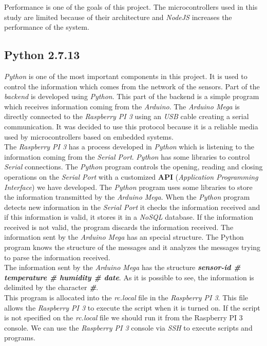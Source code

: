 Performance is one of the goals of this project. The microcontrollers used in this study are limited because of their architecture and \textit{NodeJS} increases the performance of the system.

\subsection{Python 2.7.13}

\textit{Python} is one of the most important components in this project. It is used to control the information which comes from the network of the sensors. Part of the \textit{backend} is developed using \textit{Python}. This part of the backend is a simple program which receives information coming from the \textit{Arduino}. The \textit{Arduino Mega} is directly connected to the \textit{Raspberry PI 3} using an \textit{USB} cable creating a serial communication. It was decided to use this protocol because it is a reliable media used by microcontrollers based on embedded systems.\\

The \textit{Raspberry PI 3} has a process developed in \textit{Python} which is listening to the information coming from the \textit{Serial Port}. \textit{Python} has some libraries to control \textit{Serial} connections. The \textit{Python} program controls the opening, reading and closing operations on the \textit{Serial Port} with a customized \textbf{API} \cite{API} (\textit{Application Programming Interface}) we have developed. The \textit{Python} program uses some libraries to store the information transmitted by the \textit{Arduino Mega}. When the \textit{Python} program detects new information in the \textit{Serial Port} it checks the information received and if this information is valid, it stores it in a \textit{NoSQL} database. If the information received is not valid, the program discards the information received. The information sent by the \textit{Arduino Mega} has an special structure. The Python program knows the structure of the messages and it analyzes the messages trying to parse the information received.\\

The information sent by the \textit{Arduino Mega} has the structure \textit{\textbf{sensor-id \# temperature \# humidity \# date}}. As it is possible to see, the information is delimited by the character \textbf{\textit{\#}}.\\

This program is allocated into the \textit{rc.local} file in the \textit{Raspberry PI 3}. This file allows the \textit{Raspberry PI 3} to execute the script when it is turned on. If the script is not specified on the \textit{rc.local} file we should run it from the Raspberry PI 3 console. We can use the \textit{Raspberry PI 3} console via \textit{SSH} to execute scripts and programs.\\

